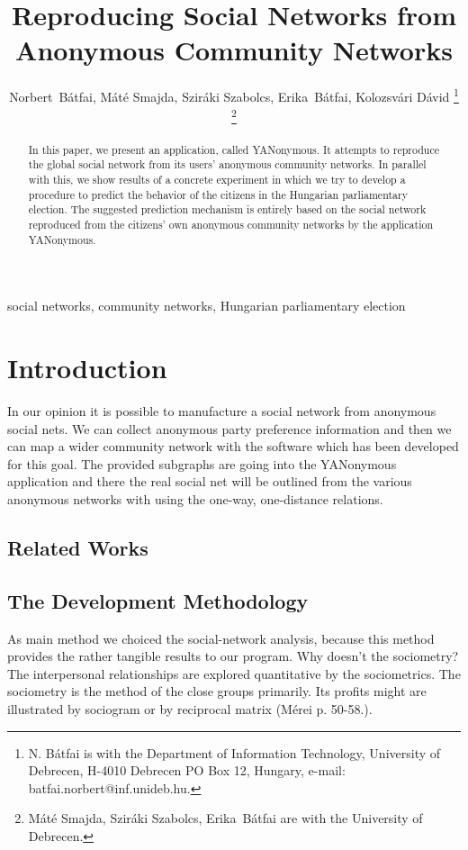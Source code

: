 \documentclass[journal]{IEEEtran}
\begin{document}
\title{Reproducing Social Networks from Anonymous Community Networks}

\author{Norbert~B\'atfai, 
M\'at\'e Smajda,
Szir\'aki Szabolcs,
Erika~B\'atfai,
Kolozsv\'ari D\'avid%
\thanks{N. B\'atfai is with the Department of Information Technology, University of Debrecen,
H-4010 Debrecen PO Box 12, Hungary, e-mail: batfai.norbert@inf.unideb.hu.}
\thanks{M\'at\'e Smajda,
Szir\'aki Szabolcs,
Erika~B\'atfai
are with the University of Debrecen.}
}

\maketitle

\begin{abstract}
In this paper, we present an application, called YANonymous. It attempts to reproduce the global social network from its users' anonymous community networks. In parallel with this, we show results of a concrete experiment in which we try to develop a procedure to predict the behavior of the citizens in the Hungarian parliamentary election. The suggested prediction mechanism is entirely based on the social network reproduced  from the citizens' own anonymous community networks by the application YANonymous.
\end{abstract}

\begin{IEEEkeywords}
social networks, community networks, Hungarian parliamentary election
\end{IEEEkeywords}

\section{Introduction}
In our opinion it is possible to manufacture a social network from anonymous social nets. We can collect anonymous party preference information and then we can map a wider community network with the software which has been developed for this goal. The provided subgraphs are going into the YANonymous application and there the real social net will be outlined from the various anonymous networks with using the one-way, one-distance relations.

\subsection{Related Works}



\subsection{The Development Methodology}
As main method we choiced the social-network analysis, because this method provides the rather tangible results to our program. 
Why doesn’t the sociometry? The interpersonal relationships are explored quantitative by the sociometrics. The sociometry is the method of the close groups primarily. Its profits might are illustrated by sociogram or by reciprocal matrix (Mérei p. 50-58.).
\end{document}
